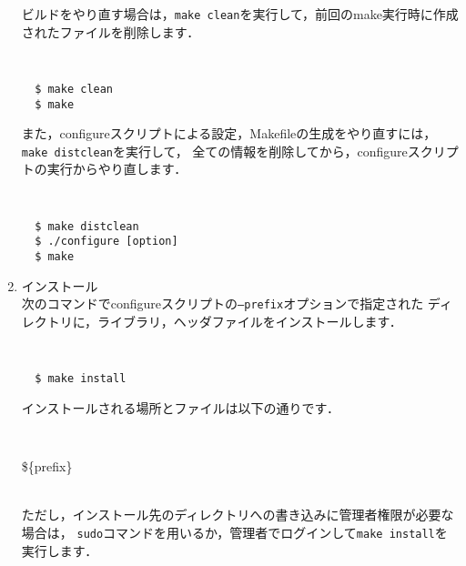 \begin{enumerate}
ビルドをやり直す場合は，{\tt make clean}を実行して，前回のmake実行時に作成されたファイルを削除します．
{\tt
\begin{verbatim}
  $ make clean
  $ make
\end{verbatim}
}

また，configureスクリプトによる設定，Makefileの生成をやり直すには，{\tt make distclean}を実行して，
全ての情報を削除してから，configureスクリプトの実行からやり直します．
{\tt
\begin{verbatim}
  $ make distclean
  $ ./configure [option]
  $ make
\end{verbatim}
}


\item インストール\\
次のコマンドでconfigureスクリプトの{\tt --prefix}オプションで指定された
ディレクトリに，ライブラリ，ヘッダファイルをインストールします．
{\tt
\begin{verbatim}
  $ make install
\end{verbatim}
}

インストールされる場所とファイルは以下の通りです．\\
{\tt
\begin{classify}{\$\{prefix\}}
\end{classify}}\\

ただし，インストール先のディレクトリへの書き込みに管理者権限が必要な場合は，
{\tt sudo}コマンドを用いるか，管理者でログインして{\tt make install}を実行します．


\end{enumerate}

